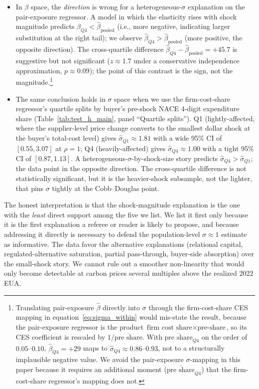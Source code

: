 \begin{itemize}
    \item In $\beta$ space, the \emph{direction} is wrong for a heterogeneous-$\sigma$ explanation on the pair-exposure regressor. A model in which the elasticity rises with shock magnitude predicts $\widehat{\beta}_{Q4} < \widehat{\beta}_{\text{pooled}}$ (i.e., more negative, indicating larger substitution at the right tail); we observe $\widehat{\beta}_{Q4} > \widehat{\beta}_{\text{pooled}}$ (more positive, the opposite direction). The cross-quartile difference $\widehat{\beta}_{Q4} - \widehat{\beta}_{\text{pooled}} = +45.7$ is suggestive but not significant ($z \approx 1.7$ under a conservative independence approximation, $p \approx 0.09$); the point of this contrast is the sign, not the magnitude.\footnote{Translating pair-exposure $\widehat{\beta}$ directly into $\sigma$ through the firm-cost-share CES mapping in equation~\eqref{eq:sigma_within} would mis-state the result, because the pair-exposure regressor is the product $\text{firm cost share} \times \text{pre-share}$, so its CES coefficient is rescaled by $1/\overline{\text{pre share}}$. With $\overline{\text{pre share}}_{Q4}$ on the order of $0.05$--$0.10$, $\widehat{\beta}_{Q4} = +29$ maps to $\widehat{\sigma}_{Q4} \approx 0.86$--$0.93$, not to a structurally implausible negative value. We avoid the pair-exposure $\sigma$-mapping in this paper because it requires an additional moment ($\overline{\text{pre share}}_{Q4}$) that the firm-cost-share regressor's mapping does not.}
    \item The same conclusion holds in $\sigma$ space when we use the firm-cost-share regressor's quartile splits by buyer's pre-shock NACE 4-digit expenditure share (Table~\ref{tab:test_h_main}, panel ``Quartile splits''). Q1 (lightly-affected, where the supplier-level price change converts to the smallest dollar shock at the buyer's total-cost level) gives $\widehat{\sigma}_{Q1} \approx 1.81$ with a wide 95\% CI of $[0.55, 3.07]$ at $\rho = 1$; Q4 (heavily-affected) gives $\widehat{\sigma}_{Q4} \approx 1.00$ with a tight 95\% CI of $[0.87, 1.13]$. A heterogeneous-$\sigma$-by-shock-size story predicts $\widehat{\sigma}_{Q4} > \widehat{\sigma}_{Q1}$; the data point in the opposite direction. The cross-quartile difference is not statistically significant, but it is the heavier-shock subsample, not the lighter, that pins $\sigma$ tightly at the Cobb--Douglas point.
\end{itemize}

The honest interpretation is that the shock-magnitude explanation is the one with the \emph{least} direct support among the five we list. We list it first only because it is the first explanation a referee or reader is likely to propose, and because addressing it directly is necessary to defend the population-level $\sigma \approx 1$ estimate as informative. The data favor the alternative explanations (relational capital, regulated-alternative saturation, partial pass-through, buyer-side absorption) over the small-shock story. We cannot rule out a smoother non-linearity that would only become detectable at carbon prices several multiples above the realized 2022 EUA.

